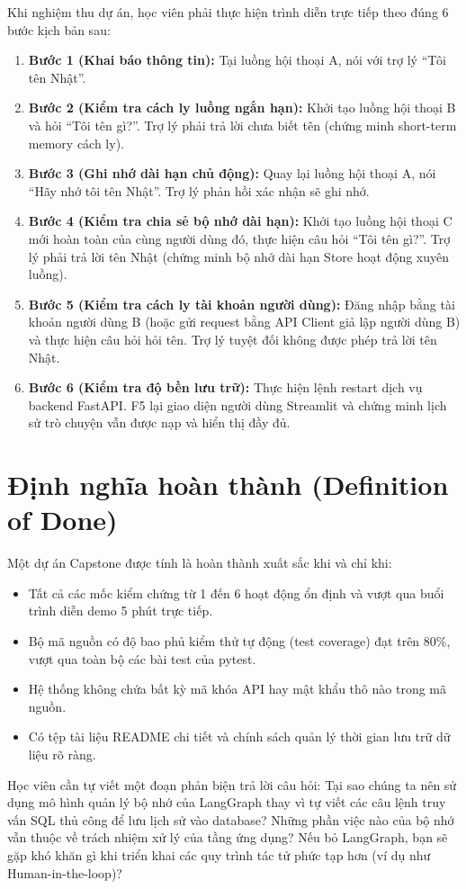 Khi nghiệm thu dự án, học viên phải thực hiện trình diễn trực tiếp theo đúng 6 bước kịch bản sau:
\begin{enumerate}
  \item \textbf{Bước 1 (Khai báo thông tin):} Tại luồng hội thoại A, nói với trợ lý ``Tôi tên Nhật''.
  \item \textbf{Bước 2 (Kiểm tra cách ly luồng ngắn hạn):} Khởi tạo luồng hội thoại B và hỏi ``Tôi tên gì?''. Trợ lý phải trả lời chưa biết tên (chứng minh short-term memory cách ly).
  \item \textbf{Bước 3 (Ghi nhớ dài hạn chủ động):} Quay lại luồng hội thoại A, nói ``Hãy nhớ tôi tên Nhật''. Trợ lý phản hồi xác nhận sẽ ghi nhớ.
  \item \textbf{Bước 4 (Kiểm tra chia sẻ bộ nhớ dài hạn):} Khởi tạo luồng hội thoại C mới hoàn toàn của cùng người dùng đó, thực hiện câu hỏi ``Tôi tên gì?''. Trợ lý phải trả lời tên Nhật (chứng minh bộ nhớ dài hạn Store hoạt động xuyên luồng).
  \item \textbf{Bước 5 (Kiểm tra cách ly tài khoản người dùng):} Đăng nhập bằng tài khoản người dùng B (hoặc gửi request bằng API Client giả lập người dùng B) và thực hiện câu hỏi hỏi tên. Trợ lý tuyệt đối không được phép trả lời tên Nhật.
  \item \textbf{Bước 6 (Kiểm tra độ bền lưu trữ):} Thực hiện lệnh restart dịch vụ backend FastAPI. F5 lại giao diện người dùng Streamlit và chứng minh lịch sử trò chuyện vẫn được nạp và hiển thị đầy đủ.
\end{enumerate}

\section{Định nghĩa hoàn thành (Definition of Done)}

Một dự án Capstone được tính là hoàn thành xuất sắc khi và chỉ khi:
\begin{itemize}
  \item Tất cả các mốc kiểm chứng từ 1 đến 6 hoạt động ổn định và vượt qua buổi trình diễn demo 5 phút trực tiếp.
  \item Bộ mã nguồn có độ bao phủ kiểm thử tự động (test coverage) đạt trên 80\%, vượt qua toàn bộ các bài test của pytest.
  \item Hệ thống không chứa bất kỳ mã khóa API hay mật khẩu thô nào trong mã nguồn.
  \item Có tệp tài liệu README chi tiết và chính sách quản lý thời gian lưu trữ dữ liệu rõ ràng.
\end{itemize}

\begin{aicheckpoint}
Học viên cần tự viết một đoạn phản biện trả lời câu hỏi: Tại sao chúng ta nên sử dụng mô hình quản lý bộ nhớ của LangGraph thay vì tự viết các câu lệnh truy vấn SQL thủ công để lưu lịch sử vào database? Những phần việc nào của bộ nhớ vẫn thuộc về trách nhiệm xử lý của tầng ứng dụng? Nếu bỏ LangGraph, bạn sẽ gặp khó khăn gì khi triển khai các quy trình tác tử phức tạp hơn (ví dụ như Human-in-the-loop)?
\end{aicheckpoint}

